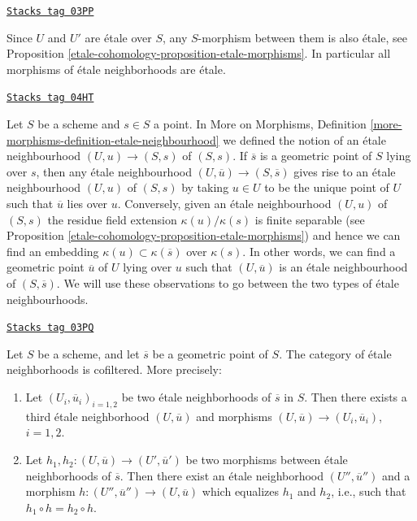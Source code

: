 \begin{remark}
\label{etale-cohomology-remark-etale-between-etale}
\href{https://stacks.math.columbia.edu/tag/03PP}{\texttt{Stacks tag 03PP}}

Since $U$ and $U'$ are \'etale over $S$, any $S$-morphism
between them is also \'etale, see
Proposition \ref{etale-cohomology-proposition-etale-morphisms}.
In particular all morphisms of \'etale neighborhoods are \'etale.
\end{remark}

\begin{remark}
\label{etale-cohomology-remark-etale-neighbourhoods}
\href{https://stacks.math.columbia.edu/tag/04HT}{\texttt{Stacks tag 04HT}}

Let $S$ be a scheme and $s \in S$ a point. In
More on Morphisms,
Definition \ref{more-morphisms-definition-etale-neighbourhood}
we defined the notion of an \'etale neighbourhood $(U, u) \to (S, s)$
of $(S, s)$. If $\overline{s}$ is a geometric point of $S$ lying over
$s$, then any \'etale neighbourhood $(U, \overline{u}) \to (S, \overline{s})$
gives rise to an \'etale neighbourhood $(U, u)$ of $(S, s)$ by taking
$u \in U$ to be the unique point of $U$ such that $\overline{u}$
lies over $u$. Conversely, given an \'etale neighbourhood $(U, u)$
of $(S, s)$ the residue field extension $\kappa(u)/\kappa(s)$
is finite separable (see
Proposition \ref{etale-cohomology-proposition-etale-morphisms})
and hence we can find an embedding $\kappa(u) \subset \kappa(\overline{s})$
over $\kappa(s)$. In other words, we can find a geometric point
$\overline{u}$ of $U$ lying over $u$ such that $(U, \overline{u})$
is an \'etale neighbourhood of $(S, \overline{s})$.
We will use these observations to go between the two types of
\'etale neighbourhoods.
\end{remark}

\begin{lemma}
\label{etale-cohomology-lemma-cofinal-etale}
\href{https://stacks.math.columbia.edu/tag/03PQ}{\texttt{Stacks tag 03PQ}}

Let $S$ be a scheme, and let $\overline{s}$ be a geometric point of $S$.
The category of \'etale neighborhoods is cofiltered. More precisely:
\begin{enumerate}
\item Let $(U_i, \overline{u}_i)_{i = 1, 2}$ be two \'etale neighborhoods of
$\overline{s}$ in $S$. Then there exists a third \'etale neighborhood
$(U, \overline{u})$ and morphisms
$(U, \overline{u}) \to (U_i, \overline{u}_i)$, $i = 1, 2$.
\item Let $h_1, h_2: (U, \overline{u}) \to (U', \overline{u}')$ be two
morphisms between \'etale neighborhoods of $\overline{s}$. Then there exist an
\'etale neighborhood $(U'', \overline{u}'')$ and a morphism
$h : (U'', \overline{u}'') \to (U, \overline{u})$
which equalizes $h_1$ and $h_2$, i.e., such that
$h_1 \circ h = h_2 \circ h$.
\end{enumerate}
\end{lemma}

